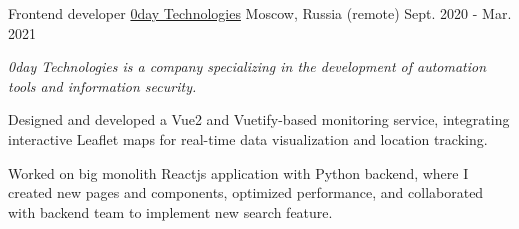 \begin{cventries}
 \cventry
    {Frontend developer} %
    {\href{https://0day.llc/}{0day Technologies}}
    {Moscow, Russia (remote)} %
    {Sept. 2020 - Mar. 2021} %
    {
      \begin{cvitems} %
      \vspace{8pt}
      \item[] {\small\textit{0day Technologies is a company specializing in the development of automation tools and information security.}}
      \vspace{8pt}
        \item {Designed and developed a Vue2 and Vuetify-based monitoring service, integrating interactive Leaflet maps for real-time data visualization and location tracking.}
        \item {Worked on big monolith Reactjs application with Python backend,
        where I created new pages and components, optimized performance, and collaborated with backend team to implement new search feature.}
      \end{cvitems}
    }
    {\vspace{16pt}}

\end{cventries}
